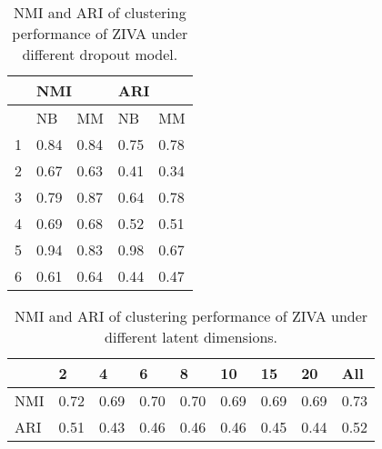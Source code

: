 \begin{table}[htb!]
\centering
\caption{NMI and ARI of clustering performance of ZIVA under different dropout model.}
\label{tnbmm}
\begin{tabular}{lllll}
\hline
  & \multicolumn{2}{l}{NMI} & \multicolumn{2}{l}{ARI} \\ \hline
  & NB         & MM         & NB         & MM         \\ \hline
1 & 0.84       & 0.84       & 0.75       & 0.78       \\
2 & 0.67       & 0.63       & 0.41       & 0.34       \\
3 & 0.79       & 0.87       & 0.64       & 0.78       \\
4 & 0.69       & 0.68       & 0.52       & 0.51       \\
5 & 0.94       & 0.83       & 0.98       & 0.67       \\
6 & 0.61       & 0.64       & 0.44       & 0.47       \\ \hline
\end{tabular}
\end{table}


\begin{table}[htb!]
\centering
\caption{NMI and ARI of clustering performance of ZIVA under different latent dimensions.}
\label{dimt}
\begin{tabular}{lllllllll}
\hline
    & 2    & 4    & 6    & 8    & 10   & 15   & 20   & All  \\ \hline
NMI & 0.72 & 0.69 & 0.70 & 0.70 & 0.69 & 0.69 & 0.69 & 0.73 \\
ARI & 0.51 & 0.43 & 0.46 & 0.46 & 0.46 & 0.45 & 0.44 & 0.52 \\ \hline
\end{tabular}
\end{table}